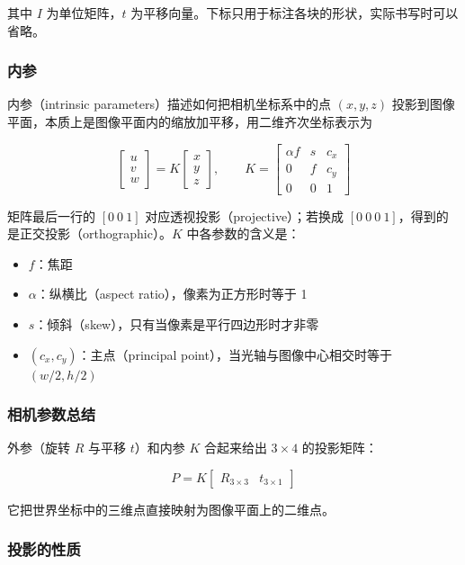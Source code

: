 \documentclass{ctexart}
\begin{document}
其中 $I$ 为单位矩阵，$t$ 为平移向量。下标只用于标注各块的形状，实际书写时可以省略。

\subsubsection{内参}

内参（intrinsic parameters）描述如何把相机坐标系中的点 $(x,y,z)$ 投影到图像平面，本质上是图像平面内的缩放加平移，用二维齐次坐标表示为

\[
\begin{bmatrix} u \\ v \\ w \end{bmatrix}
= K \begin{bmatrix} x \\ y \\ z \end{bmatrix}, \qquad
K = \begin{bmatrix}
    \alpha f & s & c_x \\
    0 & f & c_y \\
    0 & 0 & 1
\end{bmatrix}
\]

矩阵最后一行的 $[0\ 0\ 1]$ 对应透视投影（projective）；若换成 $[0\ 0\ 0\ 1]$，得到的是正交投影（orthographic）。$K$ 中各参数的含义是：

\begin{itemize}
    \item $f$：焦距
    \item $\alpha$：纵横比（aspect ratio），像素为正方形时等于 1
    \item $s$：倾斜（skew），只有当像素是平行四边形时才非零
    \item $(c_x, c_y)$：主点（principal point），当光轴与图像中心相交时等于 $(w/2, h/2)$
\end{itemize}

\subsubsection{相机参数总结}

外参（旋转 $R$ 与平移 $t$）和内参 $K$ 合起来给出 $3\times4$ 的投影矩阵：

\[
P = K \begin{bmatrix} R_{3\times3} & t_{3\times1} \end{bmatrix}
\]

它把世界坐标中的三维点直接映射为图像平面上的二维点。

\subsubsection{投影的性质}
\end{document}
